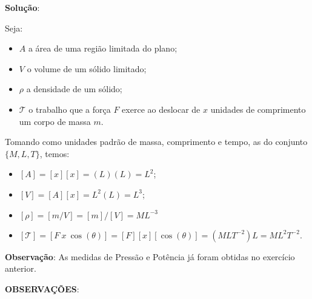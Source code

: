     \textbf{Solução}:
    {\color{orange}
     Seja:

    \begin{itemize}
    \item \(A\) a área de uma região limitada do plano;
    \item \(V\) o volume de um sólido limitado;
    \item \(\rho\) a densidade de um sólido;
    \item \(\mathcal{T}\) o trabalho que a força \(F\) exerce ao deslocar de \(x\) unidades de comprimento um corpo de massa \(m\).
    \end{itemize}
    
    Tomando como unidades padrão de massa, comprimento e tempo, as do conjunto \(\{M, L, T\}\), temos:
    
    \begin{itemize}
    \item \([A] = [x] [x] = (L) (L) = L^{2}\);
    \item \([V] = [A][x] = L^{2} (L) = L^{3}\);
    \item \([\rho] = [m/V] = [m]/[V] = M L^{-3}\) 
    \item \([\mathcal{T}] = [F\ x\ \cos(\theta)] = [F] [x] [\cos(\theta)]= (MLT^{-2})L = ML^{2}T^{-2}\).
    \end{itemize}
    
    \textbf{Observação}: As medidas de Pressão e Potência já foram obtidas no exercício anterior.
    }


\textbf{OBSERVAÇÕES}:

